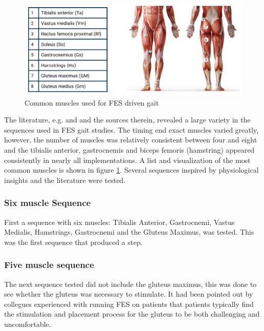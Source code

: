 \begin{figure} [h]
    \centering
    \includegraphics[width=0.85\linewidth]{images/common_muscles.png}
    \caption{Common muscles used for FES driven gait}
    \label{fig:commonMuscles}
\end{figure}

The literature, e.g. \cite{aout_effects_2023} and \cite{chaikho_transcutaneous_2022} and the sources therein, revealed a large variety in the sequences used in FES gait studies. The timing end exact muscles varied greatly, however, the number of muscles was relatively consistent between four and eight and the tibialis anterior, gastrocnemis and biceps femoris (hamstring) appeared consistently in nearly all implementations. A list and visualization of the most common muscles is shown in figure \ref{fig:commonMuscles}. Several sequences inspired by physiological insights and the literature were tested. 
\newline \newline


\subsubsection{Six muscle Sequence}

First a sequence with six muscles: Tibialis Anterior, Gastrocnemi, Vastus Medialis, Hamstrings, Gastrocnemi and the Gluteus Maximus, was tested. This was the first sequence that produced a step. 

\subsubsection{Five muscle sequence}
The next sequence tested did not include the gluteus maximus, this was done to see whether the gluteus was necessary to stimulate. It had been pointed out by collegues experienced with running FES on patients that patients typically find the stimulation and placement process for the gluteus to be both challenging and uncomfortable. 

